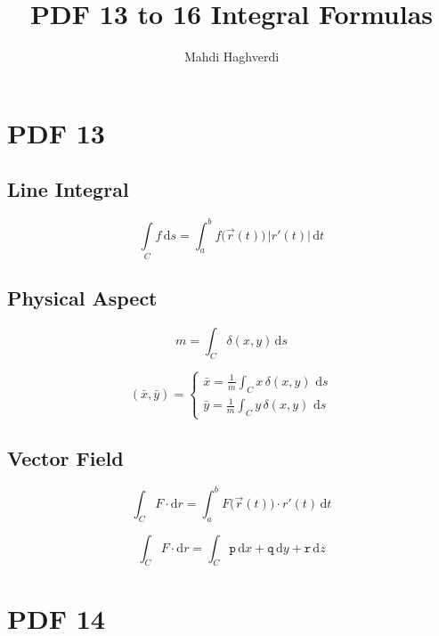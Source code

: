 \documentclass[12pt, fleqn]{book}
\title{PDF 13 to 16 Integral Formulas}
\author{Mahdi Haghverdi}
\begin{document}
	\maketitle
	\tableofcontents
	
\chapter{PDF 13}\label{pdf13}
	\section{Line Integral}
	\begin{equation}
		\int\limits_C f \, \mathrm{d}s = \int_{a}^{b} f\big(\vec{r}(t)\big) \, \lvert r'(t) \lvert \, \mathrm{d}t
	\end{equation}		

	\section{Physical Aspect}
		\begin{equation}
			m = \int_{C} \delta (x, y) \, \mathrm{d}s
		\end{equation}
		
		\begin{equation}
			(\bar{x}, \bar{y}) = 
			\begin{cases}
					\bar{x} = \frac{1}{m} \int_{C} x \, \delta(x, y) \, \, \mathrm{d}s \\
					\bar{y} = \frac{1}{m} \int_{C} y \, \delta(x, y) \, \, \mathrm{d}s
			\end{cases}
		\end{equation}
	
	\section{Vector Field}
		\begin{equation}
			\int_{C} F \cdot \mathrm{d}r = \int_{a}^{b} F\big(\vec{r}(t)\big) \cdot r'(t) \, \mathrm{d}t
		\end{equation}
		
		\begin{equation}
			\int_{C} F \cdot \mathrm{d}r = \int_{C} \mathtt{p} \, \mathrm{d}x + \mathtt{q} \, \mathrm{d}y + \mathtt{r} \, \mathrm{d}z
		\end{equation}    

\chapter{PDF 14}\label{pdf14}
\end{document}
